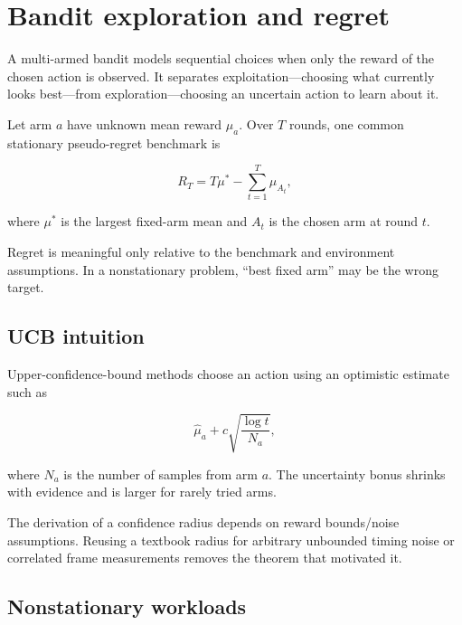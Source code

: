 \hypertarget{appendix-3dc863dbddf3}{}\label{referencestart:appendix-3dc863dbddf3}
\section{Bandit exploration and regret}\label{appendix-3dc863dbddf3-bandit-exploration-and-regret}

\hypertarget{appendix-3dc863dbddf3-bandit-exploration-and-regret}{}

A multi-armed bandit models sequential choices when only the reward of the chosen action is observed. It separates exploitation---choosing what currently looks best---from exploration---choosing an uncertain action to learn about it.

Let arm \(a\) have unknown mean reward \(\mu_a\). Over \(T\) rounds, one common stationary pseudo-regret benchmark is

\[
R_T=T\mu^*-\sum_{t=1}^{T}\mu_{A_t},
\]

where \(\mu^*\) is the largest fixed-arm mean and \(A_t\) is the chosen arm at round \(t\).

Regret is meaningful only relative to the benchmark and environment assumptions. In a nonstationary problem, ``best fixed arm'' may be the wrong target.

\subsection{UCB intuition}\label{appendix-3dc863dbddf3-ucb-intuition}

\hypertarget{appendix-3dc863dbddf3-ucb-intuition}{}

Upper-confidence-bound methods choose an action using an optimistic estimate such as

\[
\hat\mu_a+
c\sqrt{\frac{\log t}{N_a}},
\]

where \(N_a\) is the number of samples from arm \(a\). The uncertainty bonus shrinks with evidence and is larger for rarely tried arms.

The derivation of a confidence radius depends on reward bounds/noise assumptions. Reusing a textbook radius for arbitrary unbounded timing noise or correlated frame measurements removes the theorem that motivated it.

\subsection{Nonstationary workloads}\label{appendix-3dc863dbddf3-nonstationary-workloads}

